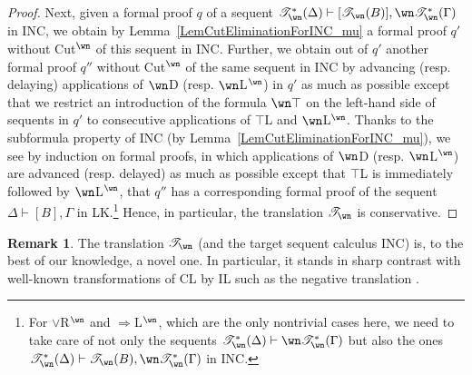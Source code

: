 \documentclass[a4paper]{article}
\theoremstyle{definition}
\newtheorem{remark}[definition]{Remark}
\theoremstyle{theorem}
\theoremstyle{remark}
\begin{document}
\begin{proof}
Next, given a formal proof $q$ of a sequent $\mathscr{T}_{\wn}^\ast(\Delta) \vdash [\mathscr{T}_{\wn}(B)], \wn \mathscr{T}_{\wn}^\ast(\Gamma)$ in \textsf{INC}, we obtain by Lemma~\ref{LemCutEliminationForINC_mu} a formal proof $q'$ without Cut$^\wn$ of this sequent in \textsf{INC}.
Further, we obtain out of $q'$ another formal proof $q''$ without Cut$^\wn$ of the same sequent in \textsf{INC} by advancing (resp. delaying) applications of $\wn$D (resp. $\wn$L$^\wn$) in $q'$ as much as possible except that we restrict an introduction of the formula $\wn \top$ on the left-hand side of sequents in $q'$ to consecutive applications of $\top$L and $\wn$L$^\wn$.
Thanks to the subformula property of \textsf{INC} (by Lemma~\ref{LemCutEliminationForINC_mu}), we see by induction on formal proofs, in which applications of $\wn$D (resp. $\wn$L$^\wn$) are advanced (resp. delayed) as much as possible except that $\top$L is immediately followed by $\wn$L$^\wn$, that $q''$ has a corresponding formal proof of the sequent $\Delta \vdash [B], \Gamma$ in \textsf{LK}.\footnote{For $\vee$R$^\wn$ and $\Rightarrow$L$^\wn$, which are the only nontrivial cases here, we need to take care of not only the sequents $\mathscr{T}_{\wn}^\ast(\Delta) \vdash \wn \mathscr{T}_{\wn}^\ast(\Gamma)$ but also the ones $\mathscr{T}_{\wn}^\ast(\Delta) \vdash \mathscr{T}_{\wn}(B), \wn \mathscr{T}_{\wn}^\ast(\Gamma)$ in \textsf{INC}.}
Hence, in particular, the translation $\mathscr{T}_{\wn}$ is conservative.
\end{proof}

\begin{remark}
The translation $\mathscr{T}_{\wn}$ (and the target sequent calculus \textsf{INC}) is, to the best of our knowledge, a novel one.
In particular, it stands in sharp contrast with well-known transformations of CL by IL such as the negative translation \cite{troelstra2000basic}.
\end{remark}
\fi
\end{document}
